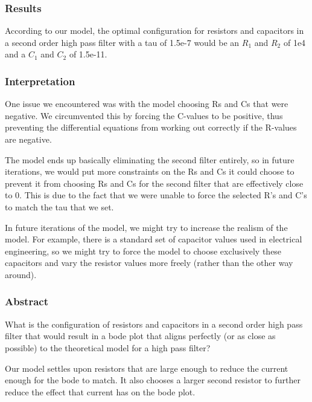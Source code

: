 \documentclass[11pt]{article}
\begin{document}
    \hypertarget{results}{%
\subsubsection{Results}\label{results}}

According to our model, the optimal configuration for resistors and
capacitors in a second order high pass filter with a tau of 1.5e-7 would
be an \(R_1\) and \(R_2\) of 1e4 and a \(C_1\) and \(C_2\) of 1.5e-11.

    \hypertarget{interpretation}{%
\subsubsection{Interpretation}\label{interpretation}}

One issue we encountered was with the model choosing Rs and Cs that were
negative. We circumvented this by forcing the C-values to be positive,
thus preventing the differential equations from working out correctly if
the R-values are negative.

The model ends up basically eliminating the second filter entirely, so
in future iterations, we would put more constraints on the Rs and Cs it
could choose to prevent it from choosing Rs and Cs for the second filter
that are effectively close to 0. This is due to the fact that we were
unable to force the selected R's and C's to match the tau that we set.

In future iterations of the model, we might try to increase the realism
of the model. For example, there is a standard set of capacitor values
used in electrical engineering, so we might try to force the model to
choose exclusively these capacitors and vary the resistor values more
freely (rather than the other way around).

    \hypertarget{abstract}{%
\subsubsection{Abstract}\label{abstract}}

What is the configuration of resistors and capacitors in a second order
high pass filter that would result in a bode plot that aligns perfectly
(or as close as possible) to the theoretical model for a high pass
filter?

Our model settles upon resistors that are large enough to reduce the
current enough for the bode to match. It also chooses a larger second
resistor to further reduce the effect that current has on the bode plot.
\end{document}
